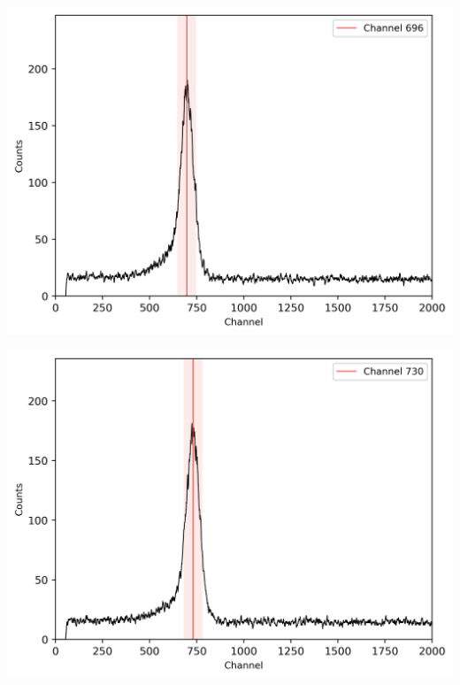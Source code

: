 \begin{multicols}{2}
\begin{center}
\begin{adjustbox}{max width=\linewidth, keepaspectratio}
        \end{adjustbox}
        \label{fig:137CsTPHC20ns}
    \end{center}
\endminipage
%
\vspace{10mm}
%
\minipage{\linewidth}
    \begin{center}
        \captionsetup{type=figure}
        \begin{adjustbox}{max width=\linewidth, keepaspectratio}
            \includegraphics[]{png/137CsTPHC40ns}
        \end{adjustbox}
        \label{fig:137CsTPHC40ns}
    \end{center}
\endminipage
%
\vspace{10mm}
%
\minipage{\linewidth}
    \begin{center}
        \captionsetup{type=figure}
        \begin{adjustbox}{max width=\linewidth, keepaspectratio}
            \includegraphics[]{png/137CsTPHC60ns}

\end{adjustbox}
\end{center}
\end{multicols}
